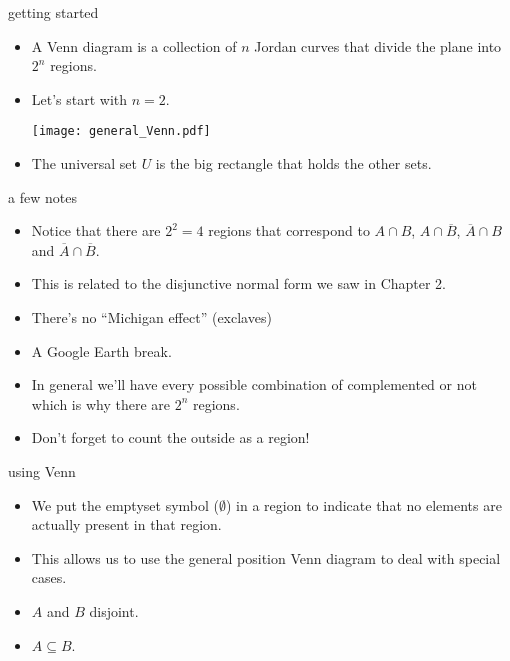 \documentclass[handout,landscape]{beamer}
\begin{document}
\begin{frame}{getting started}
\begin{itemize}
\item A Venn diagram is a collection of $n$ Jordan curves that divide the plane into $2^n$ regions. \pause
\item Let's start with $n=2$. \pause

\vspace{.2in}

\texttt{[image: general\_Venn.pdf]} \pause

\vspace{.2in}

\item The universal set $U$ is the big rectangle that holds the other sets.

\end{itemize}
\end{frame}

\begin{frame}{a few notes}
\begin{itemize}
\item Notice that there are $2^2=4$ regions that correspond to $A \cap B$, $A \cap \overline{B}$, $\overline{A} \cap B$ and $\overline{A} \cap \overline{B}$. \pause
\item This is related to the disjunctive normal form we saw in Chapter 2. \pause
\item There's no ``Michigan effect'' (exclaves) \pause
\item A Google Earth break. \pause
\item In general we'll have every possible combination of complemented or not which is why there are $2^n$ regions. \pause
\item Don't forget to count the outside as a region!
\end{itemize}
\end{frame}

\begin{frame}{using Venn}
\begin{itemize}
\item We put the emptyset symbol ($\emptyset$) in a region to indicate that no elements are actually present in that region.\pause
\item This allows us to use the general position Venn diagram to deal with special cases. \pause
\item $A$ and $B$ disjoint. \pause
\item $A \subseteq B$. 
\end{itemize}
\end{frame}
\end{document}
